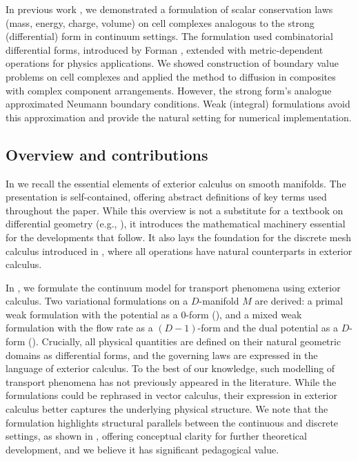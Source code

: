 \documentclass{elsarticle}
\theoremstyle{definition}
\begin{document}
In previous work \cite{berbatov2022diffusion}, we demonstrated a formulation of scalar conservation laws (mass, energy, charge, volume) on cell complexes analogous to the strong (differential) form in continuum settings. The formulation used combinatorial differential forms, introduced by Forman \cite{forman2002combinatorial}, extended with metric-dependent operations for physics applications. We showed construction of boundary value problems on cell complexes and applied the method to diffusion in composites with complex component arrangements. However, the strong form's analogue approximated Neumann boundary conditions. Weak (integral) formulations avoid this approximation and provide the natural setting for numerical implementation.

\subsection{Overview and contributions}
\label{sec:introduction/contribution}

\noindent
In  we recall the essential elements of exterior calculus on smooth manifolds. The presentation is self-contained, offering abstract definitions of key terms used throughout the paper. While this overview is not a substitute for a textbook on differential geometry (e.g., \cite{lee2012introduction}), it introduces the mathematical machinery essential for the developments that follow. It also lays the foundation for the discrete mesh calculus introduced in , where all operations have natural counterparts in exterior calculus.

In , we formulate the continuum model for transport phenomena using exterior calculus. Two variational formulations on a $D$-manifold $M$ are derived: a primal weak formulation with the potential as a $0$-form (), and a mixed weak formulation with the flow rate as a $(D-1)$-form and the dual potential as a $D$-form ().
Crucially, all physical quantities are defined on their natural geometric domains as differential forms, and the governing laws are expressed in the language of exterior calculus. To the best of our knowledge, such modelling of transport phenomena has not previously appeared in the literature. While the formulations could be rephrased in vector calculus, their expression in exterior calculus better captures the underlying physical structure. We note that the formulation highlights structural parallels between the continuous and discrete settings, as shown in , offering conceptual clarity for further theoretical development, and we believe it has significant pedagogical value.
\end{document}
